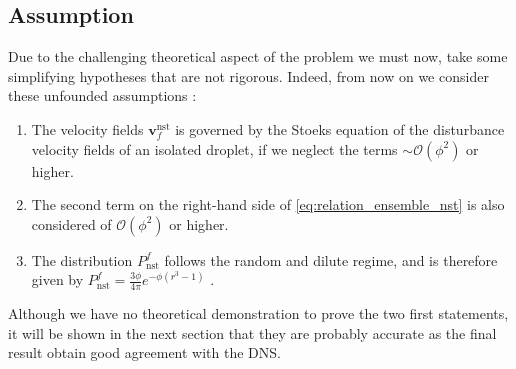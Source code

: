 \subsection{Assumption}

Due to the challenging theoretical aspect of the problem we must now, take some simplifying hypotheses that are not rigorous. 
Indeed, from now on we consider these unfounded assumptions : 
\begin{enumerate}
    \item The velocity fields $\textbf{v}_f^\text{nst}$ is governed by the Stoeks equation of the disturbance velocity fields of an isolated droplet, if we neglect the terms $\sim \mathcal{O}(\phi^2)$ or higher. 
    \item The second term on the right-hand side of \ref{eq:relation_ensemble_nst} is also considered of $\mathcal{O}(\phi^2)$ or higher. 
    \item The distribution $P_\text{nst}^f$ follows the random and dilute regime, and is therefore given by $P_\text{nst}^f = \frac{3\phi}{4\pi} e^{-\phi(r^3 -1)}$ \citep{zhang2021ensemble}. 
\end{enumerate}
Although we have no theoretical demonstration to prove the two first statements, it will be shown in the next section that they are probably accurate as the final result obtain good agreement with the DNS. 

